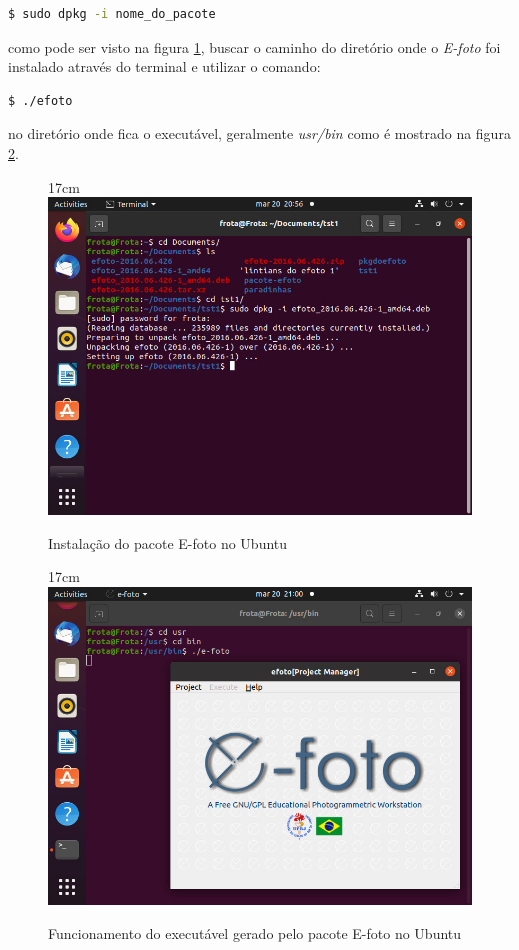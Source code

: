 \begin{lstlisting}[language=bash]
	$ sudo dpkg -i nome_do_pacote 
\end{lstlisting}

como pode ser visto na figura \ref{fig:ubuntu_insta}, buscar o caminho do diretório onde o \textit{E-foto} foi instalado através do terminal e utilizar o comando:

\begin{lstlisting}[language=bash]
	$ ./efoto
\end{lstlisting}

no diretório onde fica o executável, geralmente \textit{usr/bin} como é mostrado na figura \ref{fig:ubuntu_exec}.

\begin{figure}[!ht]{17cm}
	\centering
	\includegraphics[width=15cm]{Figuras/ubuntu_insta.jpg}
	\caption{Instalação do pacote E-foto no Ubuntu} \label{fig:ubuntu_insta}
\end{figure}

\begin{figure}[!ht]{17cm}
	\centering
	\includegraphics[width=15cm]{Figuras/ubuntu_exec.jpg}
	\caption{Funcionamento do executável gerado pelo pacote E-foto no Ubuntu} \label{fig:ubuntu_exec}
\end{figure}


